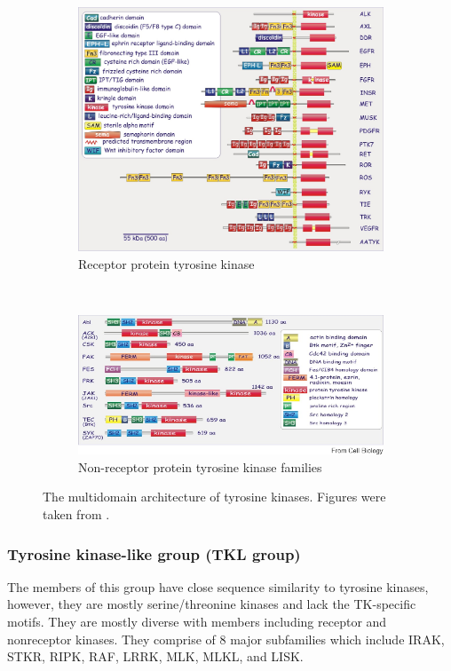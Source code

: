\documentclass[a4paper, 11pt]{report}
\begin{document}
\begin{figure}[H]
\centering
	\begin{subfigure}{\textwidth}
	  \centering
	  \includegraphics[width=\linewidth]{figures/rtk.jpg}
	  \caption{Receptor protein tyrosine kinase}
	  \label{rtk}
	\end{subfigure}\\
	\begin{subfigure}{\textwidth}
	  \centering
	  \includegraphics[width=\linewidth]{figures/nrtk.jpg}
	  \caption{Non-receptor protein tyrosine kinase families}
	  \label{nrtk}
	\end{subfigure}
\caption{The multidomain architecture of tyrosine kinases. Figures were taken from \cite{foreman2010textbook}. }
\label{tyrosine_kinase}
\end{figure}
\subsubsection{Tyrosine kinase-like group (TKL group)}
The members of this group have close sequence similarity to tyrosine kinases, however, they are mostly serine/threonine kinases and lack the TK-specific motifs. They are mostly diverse with members including receptor and nonreceptor kinases. They comprise of 8 major subfamilies which include IRAK, STKR, RIPK, RAF, LRRK, MLK, MLKL, and LISK.\\
\end{document}
